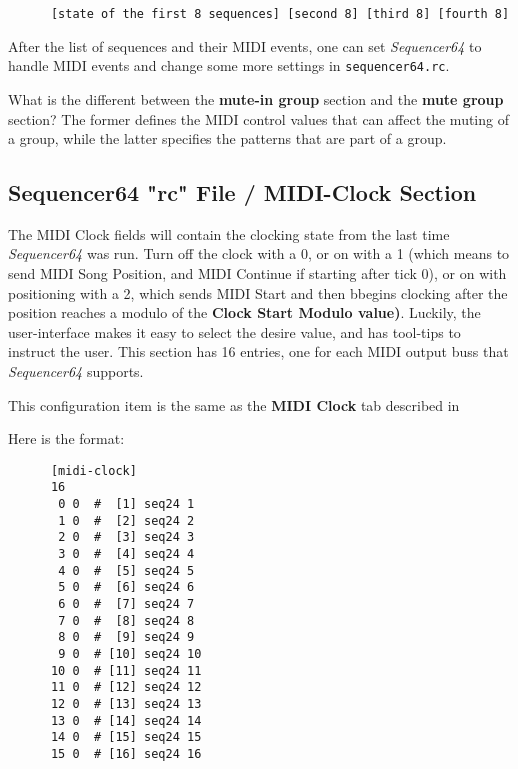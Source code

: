    \begin{verbatim}
      [state of the first 8 sequences] [second 8] [third 8] [fourth 8]
   \end{verbatim}

   After the list of sequences and their MIDI events, one can 
   set \textsl{Sequencer64} to handle MIDI events and change some more settings
   in \texttt{sequencer64.rc}.

   What is the different between the \textbf{mute-in group}
   section and the \textbf{mute group} section?  The former defines the MIDI
   control values that can affect the muting of a group, while the latter
   specifies the patterns that are part of a group.

\subsection{Sequencer64 "rc" File / MIDI-Clock Section}
\label{subsec:seq64_rc_file_midi_clock}

   The MIDI Clock fields will contain the clocking state from the last 
   time \textsl{Sequencer64} was run.  Turn off the clock with a 0, or on
   with a 1 (which means to send MIDI Song Position, and MIDI Continue if
   starting after tick 0), or on with positioning with a 2, which sends MIDI
   Start and then bbegins clocking after the position reaches a modulo of the
   \textbf{Clock Start Modulo value)}.  Luckily, the user-interface makes it
   easy to select the desire value, and has tool-tips to instruct the user.
   This section has 16 entries, one for each MIDI output buss that
   \textsl{Sequencer64} supports.

   This configuration item is the same as the 
   \textbf{MIDI Clock} tab described in
   
   Here is the format:

   \begin{verbatim}
      [midi-clock]
      16
       0 0  #  [1] seq24 1
       1 0  #  [2] seq24 2
       2 0  #  [3] seq24 3
       3 0  #  [4] seq24 4
       4 0  #  [5] seq24 5
       5 0  #  [6] seq24 6
       6 0  #  [7] seq24 7
       7 0  #  [8] seq24 8
       8 0  #  [9] seq24 9
       9 0  # [10] seq24 10
      10 0  # [11] seq24 11
      11 0  # [12] seq24 12
      12 0  # [13] seq24 13
      13 0  # [14] seq24 14
      14 0  # [15] seq24 15
      15 0  # [16] seq24 16
   \end{verbatim}

